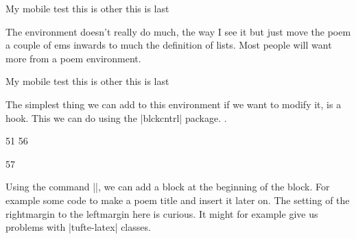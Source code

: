 \begin{teX}
\newenvironment{verse}
    {\let\\\@centercr(*@\protect\footnote{This is defined in ltmiscen.dtx}@*)
     \list{}{\itemsep  \z@
             \itemindent   -1.5em%
             \listparindent\itemindent
             \rightmargin  \leftmargin
             \advance\leftmargin 1.5em}%
       \item\relax}
    {\endlist}
\end{teX}
\makeatletter
\newenvironment{Verse}
    {\let\\\@centercr%
     \list{}{\itemsep1pt
             \itemindent-1.5em%
             \listparindent\itemindent
             \rightmargin\leftmargin
             \advance\leftmargin 1.5em}%
       \item\relax}
    {\endlist}
\makeatother
\begin{teX}
  \begin{Verse}
     My mobile test\\
     this is other\\
     this is last\\
  \end{Verse}
\end{teX}

The environment doesn't really do much, the way I see it but just move the poem a couple of ems inwards 
to much the definition of lists. Most people will want more from a poem environment.
\begin{Verse}
     My mobile test\\
      this is other\\
       this is last\\
\end{Verse}

The simplest thing we can add to this environment if we want to modify it, is a hook. This we can do using the |blckcntrl| package. .

\begin{teX}
\renewenvironment{verse}
50 {\let\\\@centercr
51 \relax{}%
56 \item\relax\PreVerse\relax}
57 {\endlist}
\end{teX}

Using the command |\PreVerse|, we can add a block at the beginning of the block. For example some code to make a poem title and insert it later on. The setting of the rightmargin to the leftmargin here is curious. It might for example give us problems with |tufte-latex| classes.

